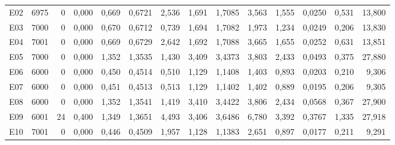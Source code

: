 \begin{singlespace}
\begin{longtable}{@{}lrrrrrrrrrrrrr@{}}
E02 & 6975 & 0 & 0{,}000 & 0{,}669 & 0{,}6721 & 2{,}536 & 1{,}691 & 1{,}7085 & 3{,}563 & 1{,}555 & 0{,}0250 & 0{,}531 & 13{,}800\\
E03 & 7000 & 0 & 0{,}000 & 0{,}670 & 0{,}6712 & 0{,}739 & 1{,}694 & 1{,}7082 & 1{,}973 & 1{,}234 & 0{,}0249 & 0{,}206 & 13{,}830\\
E04 & 7001 & 0 & 0{,}000 & 0{,}669 & 0{,}6729 & 2{,}642 & 1{,}692 & 1{,}7088 & 3{,}665 & 1{,}655 & 0{,}0252 & 0{,}631 & 13{,}851\\
E05 & 7000 & 0 & 0{,}000 & 1{,}352 & 1{,}3535 & 1{,}430 & 3{,}409 & 3{,}4373 & 3{,}803 & 2{,}433 & 0{,}0493 & 0{,}375 & 27{,}880\\
E06 & 6000 & 0 & 0{,}000 & 0{,}450 & 0{,}4514 & 0{,}510 & 1{,}129 & 1{,}1408 & 1{,}403 & 0{,}893 & 0{,}0203 & 0{,}210 & 9{,}306\\
E07 & 6000 & 0 & 0{,}000 & 0{,}451 & 0{,}4513 & 0{,}513 & 1{,}129 & 1{,}1402 & 1{,}402 & 0{,}889 & 0{,}0195 & 0{,}206 & 9{,}305\\
E08 & 6000 & 0 & 0{,}000 & 1{,}352 & 1{,}3541 & 1{,}419 & 3{,}410 & 3{,}4422 & 3{,}806 & 2{,}434 & 0{,}0568 & 0{,}367 & 27{,}900\\
E09 & 6001 & 24 & 0{,}400 & 1{,}349 & 1{,}3651 & 4{,}493 & 3{,}406 & 3{,}6486 & 6{,}780 & 3{,}392 & 0{,}3767 & 1{,}335 & 27{,}918\\
E10 & 7001 & 0 & 0{,}000 & 0{,}446 & 0{,}4509 & 1{,}957 & 1{,}128 & 1{,}1383 & 2{,}651 & 0{,}897 & 0{,}0177 & 0{,}211 & 9{,}291\\
\end{longtable}
\endgroup
{}
\end{singlespace}
